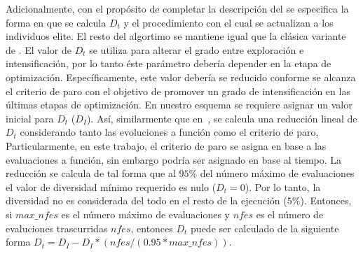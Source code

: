 Adicionalmente, con el propósito de completar la descripción del \DEEDM{} se especifica la forma en que se calcula $D_t$ y el procedimiento con el cual se actualizan a los individuos elite.
%
El resto del algortimo se mantiene igual que la clásica variante de \DE{}.
%
El valor de $D_t$ se utiliza para alterar el grado entre exploración e intensificación, por lo tanto éste parámetro debería depender en la etapa de optimización.
%
Específicamente, este valor debería se reducido conforme se alcanza el criterio de paro con el objetivo de promover un grado de intensificación en las últimas etapas de optimización.
%
En nuestro esquema se requiere asignar un valor inicial para $D_t$ ($D_I$).
%
Así, similarmente que en~\cite{segura2016novel}, se calcula una reducción lineal de $D_t$ considerando tanto las evoluciones a función como el criterio de paro, 
%
Particularmente, en este trabajo, el criterio de paro se asigna en base a las evaluaciones a función, sin embargo podría ser asignado en base al tiempo.
%
La reducción se calcula de tal forma que al $95\%$ del número máximo de evaluaciones el valor de diversidad mínimo requerido es nulo ($D_t = 0$).
%
Por lo tanto, la diversidad no es considerada del todo en el resto de la ejecución ($5\%$).
%
Entonces, si $max\_nfes$ es el número máximo de evaluaciones y $nfes$ es el número de evaluciones trascurridas $nfes$, entonces $D_t$ puede ser calculado de la siguiente forma $D_t=D_I - D_I *(nfes/(0.95*max\_nfes))$.
%

